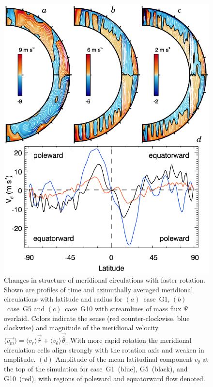 \begin{figure}[!htp]
  \begin{center}
    \includegraphics[width=0.7\linewidth]{figs/chapter_3/Figure_11.eps}
  \end{center}
  \caption[Changes in structure of meridional circulations with faster rotation]
  {Changes in structure of meridional circulations with faster
  rotation.  Shown are profiles of time and azimuthally averaged 
  meridional circulations with latitude and radius for
  $(a)$~case~G1, $(b)$~case~G5 and $(c)$~case~G10 with
  streamlines of mass flux $\Psi$ overlaid.  Colors indicate the sense
  (red counter-clockwise, blue clockwise) and magnitude of the
  meridional velocity $\langle \vec{v_m} \rangle = \langle v_r \rangle
  \vec{\hat{r}} + \langle v_\theta \rangle \vec{\hat{\theta}}$.  
  With more rapid rotation the meridional
  circulation cells align strongly with the rotation axis and weaken
  in amplitude.  $(d)$ Amplitude of the mean latitudinal component
  $v_\theta$ at the top of the simulation for case~G1~(blue),
  G5~(black), and G10~(red), with regions of poleward
  and equatorward flow denoted.   
  \label{fig:MC}}
\end{figure}

